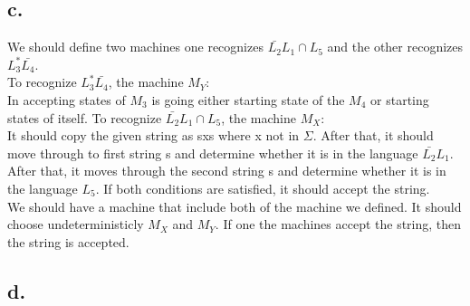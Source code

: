 \documentclass[12pt]{article}
\begin{document}
\subsection*{c.}
We should define two machines one recognizes $\bar{L_2}L_1 \cap L_5$ and the other recognizes $L_3^*\bar{L_4}$. \\
To recognize $L_3^*\bar{L_4}$, the machine $M_Y$:\\
In accepting states of $M_3$ is going either starting state of the $M_4$ or starting states of itself.
To recognize $\bar{L_2}L_1 \cap L_5$, the machine $M_X$:\\
It should copy the given string as sxs where x not in $\Sigma$. After that, it should move through to first string s and determine whether it is in the language $\bar{L_2}L_1$. After that, it moves through the second string s and determine whether it is in the language $L_5$. If both conditions are satisfied, it should accept the string.\\
We should have a machine that include both of the machine we defined. It should choose undeterministicly $M_X$ and $M_Y$. If one the machines accept the string, then the string is accepted.

\subsection*{d.}

\end{document}
